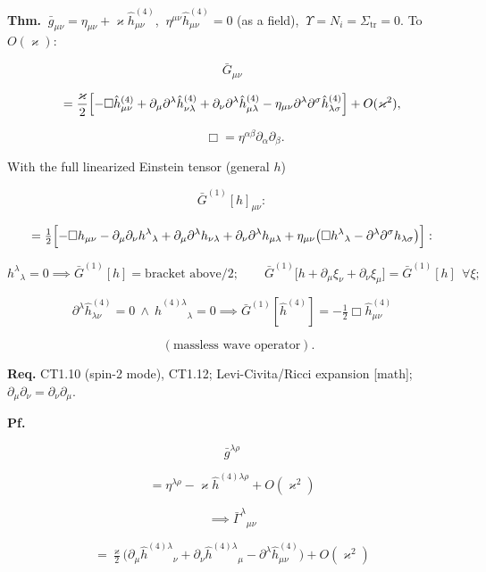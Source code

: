 \begin{theorem}\label{tag:CT1-18}
\textbf{Thm.} $\ \bar g_{\mu\nu}=\eta_{\mu\nu}+\varkappa\hat h^{(4)}_{\mu\nu}$, $\ \eta^{\mu\nu}\hat h^{(4)}_{\mu\nu}=0$ (as a field), $\ \Upsilon=N_i=\Sigma_{\mathrm{tr}}=0$. To $O(\varkappa)$:

\[
\bar G_{\mu\nu}
\]

\[
= \frac{\varkappa}{2}\Bigl[-\Box\hat h^{(4)}_{\mu\nu}+\partial_\mu\partial^\lambda\hat h^{(4)}_{\nu\lambda}+\partial_\nu\partial^\lambda\hat h^{(4)}_{\mu\lambda}-\eta_{\mu\nu}\partial^\lambda\partial^\sigma\hat h^{(4)}_{\lambda\sigma}\Bigr]+O(\varkappa^2),
\]

\[
\qquad \Box=\eta^{\alpha\beta}\partial_\alpha\partial_\beta .
\]

With the full linearized Einstein tensor (general $h$)

\[
\bar G^{(1)}[h]_{\mu\nu}:
\]

\[
= \tfrac12\Bigl[-\Box h_{\mu\nu}-\partial_\mu\partial_\nu h^\lambda{}_\lambda+\partial_\mu\partial^\lambda h_{\nu\lambda}+\partial_\nu\partial^\lambda h_{\mu\lambda}+\eta_{\mu\nu}\bigl(\Box h^\lambda{}_\lambda-\partial^\lambda\partial^\sigma h_{\lambda\sigma}\bigr)\Bigr]:
\]

\[
h^\lambda{}_\lambda=0\implies\bar G^{(1)}[h]=\text{bracket above}/2;\qquad
\bar G^{(1)}\bigl[h+\partial_\mu\xi_\nu+\partial_\nu\xi_\mu\bigr]=\bar G^{(1)}[h]\ \ \forall\xi;
\]

\[
\partial^\lambda\hat h^{(4)}_{\lambda\nu}=0\ \wedge\ \hat h^{(4)\lambda}{}_\lambda=0\implies\bar G^{(1)}[\hat h^{(4)}]=-\tfrac12\Box\hat h^{(4)}_{\mu\nu}
\]

\[
\quad (\text{massless wave operator}).
\]

\textbf{Req.} CT1.10 (spin-2 mode), CT1.12; Levi-Civita/Ricci expansion [math]; $\partial_\mu\partial_\nu=\partial_\nu\partial_\mu$.

\textbf{Pf.}

\[
\bar g^{\lambda\rho}
\]

\[
= \eta^{\lambda\rho}-\varkappa\hat h^{(4)\lambda\rho}+O(\varkappa^2)
\]

\[
\implies \bar\Gamma^\lambda{}_{\mu\nu}
\]

\[
= \tfrac\varkappa2\bigl(\partial_\mu\hat h^{(4)\lambda}{}_\nu+\partial_\nu\hat h^{(4)\lambda}{}_\mu-\partial^\lambda\hat h^{(4)}_{\mu\nu}\bigr)+O(\varkappa^2)
\]


\end{theorem}
